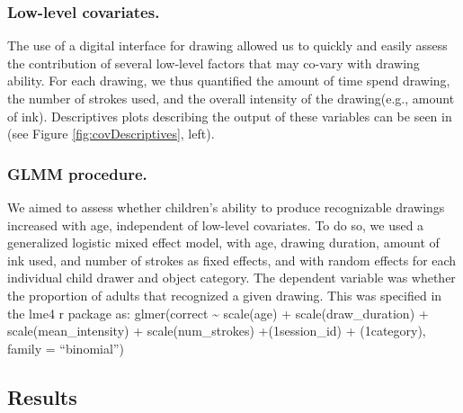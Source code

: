 \documentclass[10pt, letterpaper]{article}
\begin{document}
\subsubsection{Low-level covariates.}\label{low-level-covariates.}

The use of a digital interface for drawing allowed us to quickly and
easily assess the contribution of several low-level factors that may
co-vary with drawing ability. For each drawing, we thus quantified the
amount of time spend drawing, the number of strokes used, and the
overall intensity of the drawing(e.g., amount of ink). Descriptives
plots describing the output of these variables can be seen in (see
Figure \ref{fig:covDescriptives}, left).

\subsubsection{GLMM procedure.}\label{glmm-procedure.}

We aimed to assess whether children's ability to produce recognizable
drawings increased with age, independent of low-level covariates. To do
so, we used a generalized logistic mixed effect model, with age, drawing
duration, amount of ink used, and number of strokes as fixed effects,
and with random effects for each individual child drawer and object
category. The dependent variable was whether the proportion of adults
that recognized a given drawing. This was specified in the lme4 r
package as: glmer(correct \textasciitilde{} scale(age) +
scale(draw\_duration) + scale(mean\_intensity) + scale(num\_strokes)
+(1\textbar{}session\_id) + (1\textbar{}category), family =
``binomial'')

\subsection{Results}\label{results}
\end{document}
